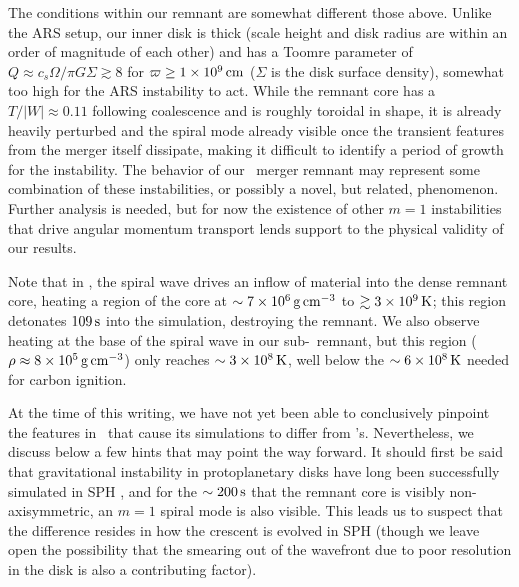 
The conditions within our remnant are somewhat different those above.  Unlike the ARS setup, our inner disk is thick (scale height and disk radius are within an order of magnitude of each other) and has a Toomre parameter of $Q \approx c_s\Omega/\pi G \Sigma \gtrsim 8$ for $\varpi \geq 1\times10^9\,\mathrm{cm}$ ($\Sigma$ is the disk surface density), somewhat too high for the ARS instability to act.  While the remnant core has a $T/|W| \approx 0.11$ following coalescence and is roughly toroidal in shape, it is already heavily perturbed and the spiral mode already visible once the transient features from the merger itself dissipate, making it difficult to identify a period of growth for the instability.  The behavior of our \arepo\ merger remnant may represent some combination of these instabilities, or possibly a novel, but related, phenomenon.  Further analysis is needed, but for now the existence of other $m = 1$ instabilities that drive angular momentum transport lends support to the physical validity of our results.



Note that in \cite{kash+15}, the spiral wave drives an inflow of material into the dense remnant core, heating a region of the core at $\sim7\times10^6\,\gcc$ to $\gtrsim3\times10^9\,\mathrm{K}$; this region detonates $109\,\mathrm{s}$ into the simulation, destroying the remnant.  We also observe heating at the base of the spiral wave in our sub-\Mch\ remnant, but this region ($\rho \approx 8\times10^5\,\gcc$) only reaches $\sim3\times10^8\,\mathrm{K}$, well below the $\sim6\times10^8\,\mathrm{K}$ needed for carbon ignition.

At the time of this writing, we have not yet been able to conclusively pinpoint the features in \gasoline\ that cause its simulations to differ from \arepo's.  Nevertheless, we discuss below a few hints that may point the way forward.  It should first be said that gravitational instability in protoplanetary disks have long been successfully simulated in SPH \citep{ricela05, merub10, rogew12}, and for the $\sim200\,\mathrm{s}$ that the remnant core is visibly non-axisymmetric, an $m = 1$ spiral mode is also visible.  This leads us to suspect that the difference resides in how the crescent is evolved in SPH (though we leave open the possibility that the smearing out of the wavefront due to poor resolution in the disk is also a contributing factor).  

